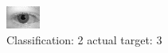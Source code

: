 \begin{figure}[h!]
\begin{center}
\includegraphics[width=0.60\columnwidth]{figures/ID600_class_2_target_3.png}
\end{center}
\caption{ Classification: 2 actual target: 3}
\label{fig:ID600_class_2_target_3}
\end{figure}

